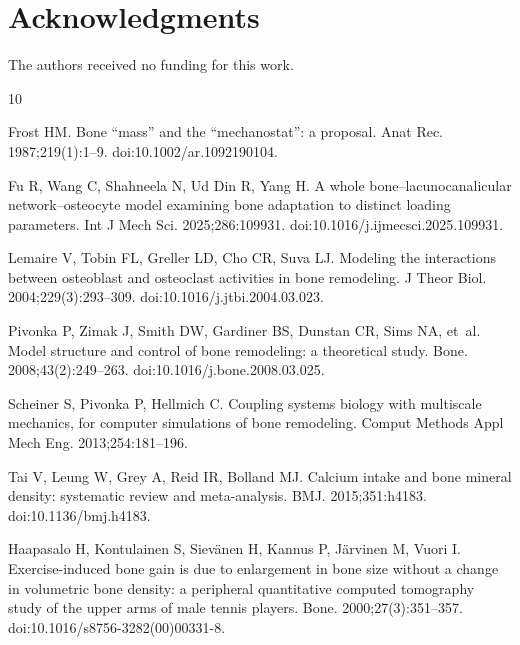 \documentclass[10pt,letterpaper]{article}
\begin{document}
\section*{Acknowledgments}

The authors received no funding for this work.

\nolinenumbers

% 
% 

\begin{thebibliography}{10}

Frost HM.
\newblock Bone ``mass'' and the ``mechanostat'': a proposal.
\newblock Anat Rec. 1987;219(1):1--9. doi:10.1002/ar.1092190104.

Fu R, Wang C, Shahneela N, Ud Din R, Yang H.
\newblock A whole bone--lacunocanalicular network--osteocyte model examining
  bone adaptation to distinct loading parameters.
\newblock Int J Mech Sci. 2025;286:109931. doi:10.1016/j.ijmecsci.2025.109931.

Lemaire V, Tobin FL, Greller LD, Cho CR, Suva LJ.
\newblock Modeling the interactions between osteoblast and osteoclast
  activities in bone remodeling.
\newblock J Theor Biol. 2004;229(3):293--309. doi:10.1016/j.jtbi.2004.03.023.

Pivonka P, Zimak J, Smith DW, Gardiner BS, Dunstan CR, Sims NA, et~al.
\newblock Model structure and control of bone remodeling: a theoretical study.
\newblock Bone. 2008;43(2):249--263. doi:10.1016/j.bone.2008.03.025.

Scheiner S, Pivonka P, Hellmich C.
\newblock Coupling systems biology with multiscale mechanics, for computer
  simulations of bone remodeling.
\newblock Comput Methods Appl Mech Eng. 2013;254:181--196.

Tai V, Leung W, Grey A, Reid IR, Bolland MJ.
\newblock Calcium intake and bone mineral density: systematic review and
  meta-analysis.
\newblock BMJ. 2015;351:h4183. doi:10.1136/bmj.h4183.

Haapasalo H, Kontulainen S, Siev\"{a}nen H, Kannus P, J\"{a}rvinen M, Vuori I.
\newblock Exercise-induced bone gain is due to enlargement in bone size without
  a change in volumetric bone density: a peripheral quantitative computed
  tomography study of the upper arms of male tennis players.
\newblock Bone. 2000;27(3):351--357. doi:10.1016/s8756-3282(00)00331-8.


\end{thebibliography}
\end{document}
